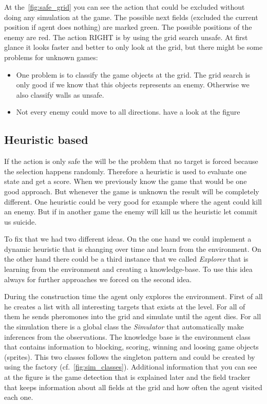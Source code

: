 At the~\cref{fig:safe_grid} you can see the action that could be excluded without doing any simulation at the game.
The possible next fields (excluded the current position if agent does nothing) are marked green. The possible positions
of the enemy are red. The action RIGHT is by using the grid search unsafe. 
At first glance it looks faster and better to only look at the grid, but there might be some problems for unknown games:

\begin{itemize}
  \item One problem is to classify the game objects at the grid. The grid search is only good if we know that this objects represents an enemy. Otherwise
  we also classify walls as unsafe.
  \item Not every enemy could move to all directions. have a look at the figure 
\end{itemize}



\subsection{Heuristic based} 
 
If the action is only safe the will be the problem that no target is forced because the selection happens randomly.
Therefore a heuristic is used to evaluate one state and get a score. When we previously know the game
that would be one good approach. But whenever the game is unknown the result will be completely different.
One heuristic could be very good for example where the agent could kill an enemy. But if in another game
the enemy will kill us the heuristic let commit us suicide.

To fix that we had two different ideas. On the one hand we could implement a dynamic heuristic that is changing over time
and learn from the environment. On the other hand there could be a third instance that we called \textit{Explorer} 
that is learning from the environment and creating a knowledge-base. 
To use this idea always for further approaches we forced on the second idea.

During the construction time the agent only explores the environment. 
First of all he creates a list with all interesting targets that exists at the level. For all of them he sends pheromones into the grid
and simulate until the agent dies. 
For all the simulation there is a global class the \textit{Simulator} that automatically make inferences from the observations.
The knowledge base is the environment class that contains information to blocking, scoring, winning and loosing game objects (sprites).
This two classes follows the singleton pattern and could be created by using the factory (cf.~\cref{fig:sim_classes}).
Additional information that you can see at the figure is the game detection that is explained later and the field tracker that keeps 
information about all fields at the grid and how often the agent visited each one.

